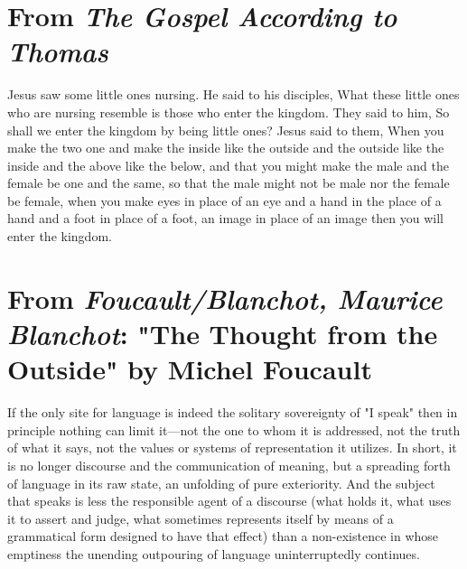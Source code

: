 \documentclass[
]{memoir}
\begin{document}
\hypertarget{from-the-gospel-according-to-thomas}{%
\section*{\texorpdfstring{From \emph{The Gospel According to
Thomas}}{From The Gospel According to Thomas}}\label{from-the-gospel-according-to-thomas}}

Jesus saw some little ones nursing. He said to his disciples, What these
little ones who are nursing resemble is those who enter the kingdom.
They said to him, So shall we enter the kingdom by being little ones?
Jesus said to them, When you make the two one and make the inside like
the outside and the outside like the inside and the above like the
below, and that you might make the male and the female be one and the
same, so that the male might not be male nor the female be female, when
you make eyes in place of an eye and a hand in the place of a hand and a
foot in place of a foot, an image in place of an image then you will
enter the kingdom.

\hypertarget{from-foucaultblanchot-maurice-blanchot-the-thought-from-the-outside-by-michel-foucault}{%
\section*{\texorpdfstring{From \emph{Foucault/Blanchot, Maurice
Blanchot}: "The Thought from the Outside" by Michel
Foucault}{From Foucault/Blanchot, Maurice Blanchot: "The Thought from the Outside" by Michel Foucault}}\label{from-foucaultblanchot-maurice-blanchot-the-thought-from-the-outside-by-michel-foucault}}

If the only site for language is indeed the solitary sovereignty of "I
speak" then in principle nothing can limit it---not the one to whom it
is addressed, not the truth of what it says, not the values or systems
of representation it utilizes. In short, it is no longer discourse and
the communication of meaning, but a spreading forth of language in its
raw state, an unfolding of pure exteriority. And the subject that speaks
is less the responsible agent of a discourse (what holds it, what uses
it to assert and judge, what sometimes represents itself by means of a
grammatical form designed to have that effect) than a non-existence in
whose emptiness the unending outpouring of language uninterruptedly
continues.
\end{document}
